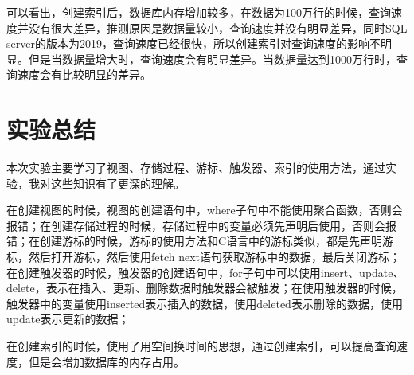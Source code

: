 \documentclass[UTF8,12pt]{article}
\begin{document}
可以看出，创建索引后，数据库内存增加较多，在数据为100万行的时候，查询速度并没有很大差异，推测原因是数据量较小，查询速度并没有明显差异，同时SQL server的版本为2019，查询速度已经很快，所以创建索引对查询速度的影响不明显。但是当数据量增大时，查询速度会有明显差异。当数据量达到1000万行时，查询速度会有比较明显的差异。

\section{实验总结}
本次实验主要学习了视图、存储过程、游标、触发器、索引的使用方法，通过实验，我对这些知识有了更深的理解。

在创建视图的时候，视图的创建语句中，where子句中不能使用聚合函数，否则会报错；在创建存储过程的时候，存储过程中的变量必须先声明后使用，否则会报错；在创建游标的时候，游标的使用方法和C语言中的游标类似，都是先声明游标，然后打开游标，然后使用fetch next语句获取游标中的数据，最后关闭游标；在创建触发器的时候，触发器的创建语句中，for子句中可以使用insert、update、delete，表示在插入、更新、删除数据时触发器会被触发；在使用触发器的时候，触发器中的变量使用inserted表示插入的数据，使用deleted表示删除的数据，使用update表示更新的数据；

在创建索引的时候，使用了用空间换时间的思想，通过创建索引，可以提高查询速度，但是会增加数据库的内存占用。
\end{document}
